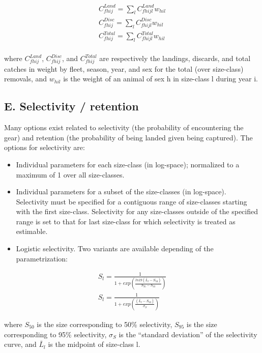 \documentclass[]{article}
\providecommand{\tightlist}{%
  \setlength{\itemsep}{0pt}\setlength{\parskip}{0pt}}
\begin{document}
\begin{align}
 C^{Land}_{fhij} = \sum_{l}  C^{Land}_{fhijl}w_{hil} \\
 C^{Disc}_{fhij} = \sum_{l}  C^{Disc}_{fhijl}w_{hil} \\
 C^{Total}_{fhij} = \sum_{l}  C^{Total}_{fhijl}w_{hil} \\
\end{align}

where \(C^{Land}_{fhij}\), \(C^{Disc}_{fhij}\), and \(C^{Total}_{fhij}\)
are respectively the landings, discards, and total catches in weight by
fleet, season, year, and sex for the total (over size-class) removals,
and \(w_{hil}\) is the weight of an animal of sex h in size-class l
during year i.

\subsection{E. Selectivity / retention}\label{e.-selectivity-retention}

Many options exist related to selectivity (the probability of
encountering the gear) and retention (the probability of being landed
given being captured). The options for selectivity are:

\begin{itemize}
\tightlist
\item
  Individual parameters for each size-class (in log-space); normalized
  to a maximum of 1 over all size-classes.
\item
  Individual parameters for a subset of the size-classes (in log-space).
  Selectivity must be specified for a contiguous range of size-classes
  starting with the first size-class. Selectivity for any size-classes
  outside of the specified range is set to that for last size-class for
  which selectivity is treated as estimable.
\item
  Logistic selectivity. Two variants are available depending of the
  parametrization:
\end{itemize}

\begin{align}
   S_{l} = \frac {1} {1 + exp(\frac{ln19(\bar{L}_l - S_{50})}{S_{95}-S_{50}})} \\[2ex]
   S_{l} = \frac {1} {1 + exp(\frac{(\bar{L}_l - S_{50})}{\sigma_{S}})} 
  \end{align}

where \(S_{50}\) is the size corresponding to 50\% selectivity,
\(S_{95}\) is the size corresponding to 95\% selectivity, \(\sigma_{S}\)
is the ``standard deviation'' of the selectivity curve, and
\(\bar{L}_l\) is the midpoint of size-class l.
\end{document}
